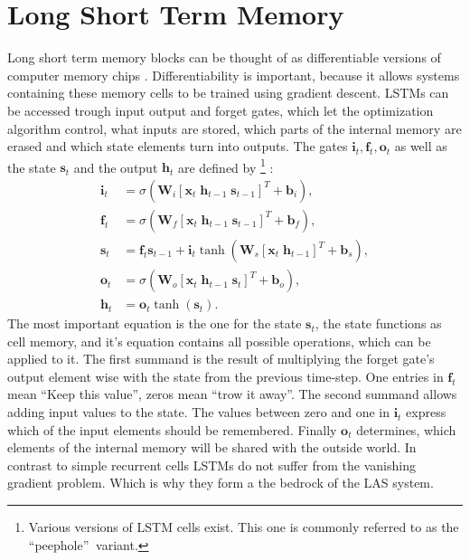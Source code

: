 \documentclass{article}
\begin{document}
\section{Long Short Term Memory}
\label{sec:LSTM}
Long short term memory blocks can be thought of as differentiable versions of computer memory chips \cite{Graves2012}. Differentiability is important, because it allows systems containing these memory cells to be trained using gradient descent. LSTMs can be accessed trough input output and forget gates, which let the optimization algorithm control, what inputs are stored, which parts of the internal memory are erased and which state elements turn into outputs. 
The gates $\mathbf{i}_t, \mathbf{f}_t, \mathbf{o}_t$ as well as the state $\mathbf{s}_t$ and the output  $\mathbf{h}_t$ are defined by \cite{Graves2013}\footnote{ Various versions of LSTM cells exist. This one is commonly referred to as the \textquotedblleft peephole\textquotedblright $ \: $ variant. } : 
\begin{align}
\mathbf{i}_t &= \sigma (\mathbf{W}_i [\mathbf{x}_t \; \mathbf{h}_{t-1} \; \mathbf{s}_{t-1}]^T + \mathbf{b}_i), \\
\mathbf{f}_t &= \sigma (\mathbf{W}_f [\mathbf{x}_t \; \mathbf{h}_{t-1} \; \mathbf{s}_{t-1}]^T + \mathbf{b}_f), \\
\mathbf{s}_t &= \mathbf{f}_t \mathbf{s}_{t-1} + \mathbf{i}_t \tanh( \mathbf{W}_s [\mathbf{x}_t \; \mathbf{h}_{t-1}]^T + \mathbf{b}_s ), \\
\mathbf{o}_t &= \sigma (\mathbf{W}_o [\mathbf{x}_t \; \mathbf{h}_{t-1} \; \mathbf{s}_t]^T + \mathbf{b}_o ), \\
\mathbf{h}_t &= \mathbf{o}_t \tanh(\mathbf{s}_t).
\end{align}
The most important equation is the one for the state $\mathbf{s}_t$, the state functions as cell memory, and it's equation contains all possible operations, which can be applied to it. The first summand is the result of multiplying the forget gate's output element wise with the state from the previous time-step. One entries in $\mathbf{f}_t$ mean \enquote{Keep this value}, zeros mean \enquote{trow it away}. The second summand allows adding input values to the state. The values between zero and one in $\mathbf{i}_t$ express which of the input elements should be remembered. Finally $\mathbf{o}_t$ determines, which elements of the internal memory will be shared with the outside world. In contrast to simple recurrent cells LSTMs do not suffer from the vanishing gradient problem. Which is why they form a the bedrock of the LAS system.
\end{document}
